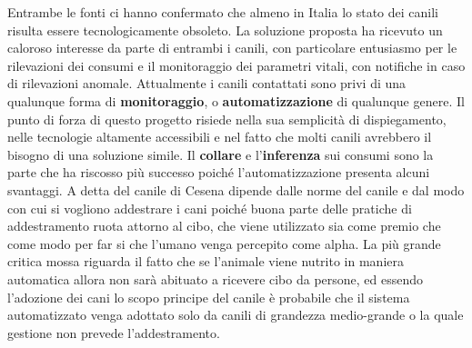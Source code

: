 Entrambe le fonti ci hanno confermato che almeno in Italia lo stato dei canili risulta essere tecnologicamente obsoleto.
La soluzione proposta ha ricevuto un caloroso interesse da parte di entrambi i canili, con particolare entusiasmo per le rilevazioni dei consumi e il monitoraggio dei parametri vitali, con notifiche in caso di rilevazioni anomale.
Attualmente i canili contattati sono privi di una qualunque forma di \textbf{monitoraggio}, o \textbf{automatizzazione} di qualunque genere.
Il punto di forza di questo progetto risiede nella sua semplicità di dispiegamento, nelle tecnologie altamente accessibili e nel fatto che molti canili avrebbero il bisogno di una soluzione simile.
Il \textbf{collare} e l'\textbf{inferenza} sui consumi sono la parte che ha riscosso più successo poiché l'automatizzazione presenta alcuni svantaggi.
A detta del canile di Cesena dipende dalle norme del canile e dal modo con cui si vogliono addestrare i cani poiché buona parte delle pratiche di addestramento ruota attorno al cibo, che viene utilizzato sia come premio che come modo per far si che l'umano venga percepito come alpha.
La più grande critica mossa riguarda il fatto che se l'animale viene nutrito in maniera automatica allora non sarà abituato a ricevere cibo da persone, ed essendo l'adozione dei cani lo scopo principe del canile è probabile che il sistema automatizzato venga adottato solo da canili di grandezza medio-grande o la quale gestione non prevede l'addestramento. 